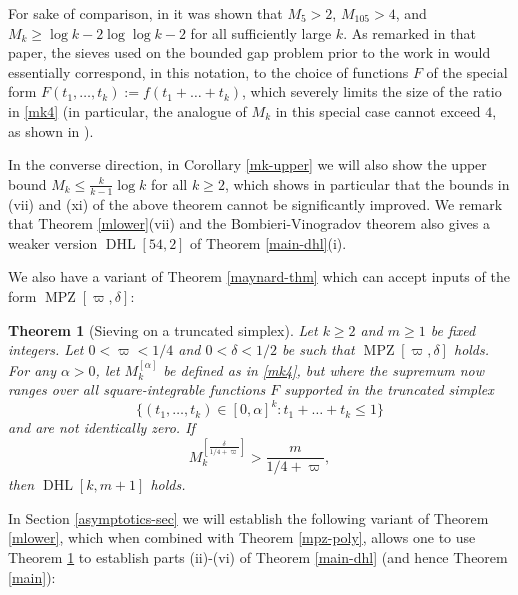 \documentclass{bmcart}
\DeclareMathOperator*\MPZ{MPZ}
\DeclareMathOperator*\DHL{DHL}
\theoremstyle{plain}
\newtheorem{theorem}{Theorem}[section]
\theoremstyle{definition}
\begin{document}
For sake of comparison, in \cite[Proposition 4.3]{maynard-new} it was shown that $M_5 > 2$, $M_{105} > 4$, and $M_k \geq \log k - 2\log\log k - 2$ for all sufficiently large $k$.  As remarked in that paper, the sieves used on the bounded gap problem prior to the work in \cite{maynard-new} would essentially correspond, in this notation, to the choice of functions $F$ of the special form $F(t_1,\dots,t_k) := f(t_1+\dots+t_k)$, which severely limits the size of the ratio in
\eqref{mk4} (in particular, the analogue of $M_k$ in this special case cannot exceed $4$, as shown in \cite{sound}).

In the converse direction, in Corollary \ref{mk-upper} we will also show the upper bound $M_k \leq \frac{k}{k-1} \log k$ for all $k \geq 2$, which shows in particular that the bounds in (vii) and (xi) of the above theorem cannot be significantly improved.  We  remark that Theorem \ref{mlower}(vii) and the Bombieri-Vinogradov theorem also gives a weaker version $\DHL[54,2]$ of Theorem \ref{main-dhl}(i).

We also have a variant of Theorem \ref{maynard-thm} which can accept inputs of the form $\MPZ[\varpi,\delta]$:

\begin{theorem}[Sieving on a truncated simplex]\label{maynard-trunc}  Let $k \geq 2$ and $m \geq 1$ be fixed integers. Let $0<\varpi<1/4$ and $0 <\delta < 1/2$ be such that $\MPZ[\varpi,\delta]$ holds.  For any $\alpha>0$, let $M_k^{[\alpha]}$ be defined as in \eqref{mk4}, but where the supremum now ranges over all square-integrable functions $F$ supported in the \emph{truncated} simplex
\begin{equation}\label{ttk}
 \{ (t_1,\dots,t_k) \in [0,\alpha]^k: t_1+\dots+t_k \leq 1 \}
\end{equation}
and are not identically zero.  If
$$ M_k^{[\frac{\delta}{1/4+\varpi}]} > \frac{m}{1/4+\varpi},$$
then $\DHL[k,m+1]$ holds.
\end{theorem}

In Section \ref{asymptotics-sec} we will establish the following variant of Theorem \ref{mlower}, which when combined with Theorem \ref{mpz-poly}, allows one to use Theorem \ref{maynard-trunc} to establish parts (ii)-(vi) of Theorem \ref{main-dhl} (and hence Theorem \ref{main}):
\end{document}
